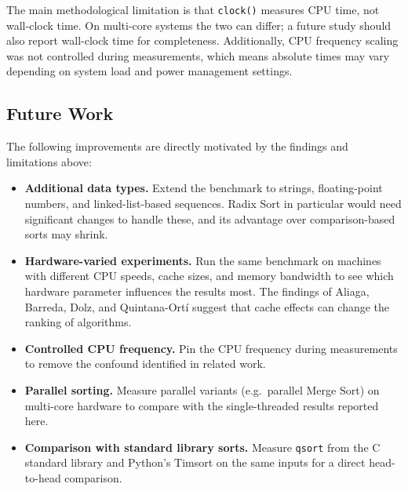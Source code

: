 \documentclass[11pt,a4paper]{article}
\begin{document}
The main methodological limitation is that \texttt{clock()} measures CPU time, not wall-clock time. On multi-core systems the two can differ; a future study should also report wall-clock time for completeness. Additionally, CPU frequency scaling was not controlled during measurements, which means absolute times may vary depending on system load and power management settings.

\subsection{Future Work}

The following improvements are directly motivated by the findings and limitations above:

\begin{itemize}[noitemsep]
  \item \textbf{Additional data types.} Extend the benchmark to strings, floating-point numbers, and linked-list-based sequences. Radix Sort in particular would need significant changes to handle these, and its advantage over comparison-based sorts may shrink.
  \item \textbf{Hardware-varied experiments.} Run the same benchmark on machines with different CPU speeds, cache sizes, and memory bandwidth to see which hardware parameter influences the results most. The findings of Aliaga, Barreda, Dolz, and Quintana-Ortí \cite{aliaga2017} suggest that cache effects can change the ranking of algorithms.
  \item \textbf{Controlled CPU frequency.} Pin the CPU frequency during measurements to remove the confound identified in related work.
  \item \textbf{Parallel sorting.} Measure parallel variants (e.g.\ parallel Merge Sort) on multi-core hardware to compare with the single-threaded results reported here.
  \item \textbf{Comparison with standard library sorts.} Measure \texttt{qsort} from the C standard library and Python's Timsort on the same inputs for a direct head-to-head comparison.
\end{itemize}




\appendix
\end{document}
